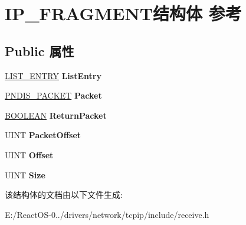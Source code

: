\hypertarget{struct_i_p___f_r_a_g_m_e_n_t}{}\section{I\+P\+\_\+\+F\+R\+A\+G\+M\+E\+N\+T结构体 参考}
\label{struct_i_p___f_r_a_g_m_e_n_t}
\subsection*{Public 属性}
\begin{DoxyCompactItemize}
\item 
\mbox{\label{struct_i_p___f_r_a_g_m_e_n_t_a0214faaf83a4a71c3f278346d5b29458}} 
\hyperlink{struct___l_i_s_t___e_n_t_r_y}{L\+I\+S\+T\+\_\+\+E\+N\+T\+RY} {\bfseries List\+Entry}
\item 
\mbox{\label{struct_i_p___f_r_a_g_m_e_n_t_a2b216bdd33346cf8f7b79428858437e6}} 
\hyperlink{struct___n_d_i_s___p_a_c_k_e_t}{P\+N\+D\+I\+S\+\_\+\+P\+A\+C\+K\+ET} {\bfseries Packet}
\item 
\mbox{\label{struct_i_p___f_r_a_g_m_e_n_t_afdb81174f75beae000b70745c565c810}} 
\hyperlink{_processor_bind_8h_a112e3146cb38b6ee95e64d85842e380a}{B\+O\+O\+L\+E\+AN} {\bfseries Return\+Packet}
\item 
\mbox{\label{struct_i_p___f_r_a_g_m_e_n_t_af3d35836aa9b2006672e8a8b02f8483e}} 
U\+I\+NT {\bfseries Packet\+Offset}
\item 
\mbox{\label{struct_i_p___f_r_a_g_m_e_n_t_ab2c761faded84b9d808833c090cb02f1}} 
U\+I\+NT {\bfseries Offset}
\item 
\mbox{\label{struct_i_p___f_r_a_g_m_e_n_t_ab066663f276d348de8e88b9820b43e9c}} 
U\+I\+NT {\bfseries Size}
\end{DoxyCompactItemize}


该结构体的文档由以下文件生成\+:\begin{DoxyCompactItemize}
\item 
E\+:/\+React\+O\+S-\/0../drivers/network/tcpip/include/receive.\+h\end{DoxyCompactItemize}

